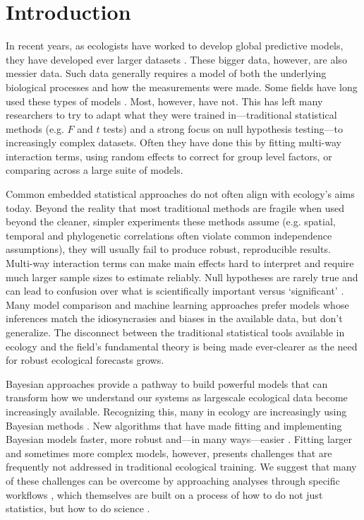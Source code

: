 \documentclass[11pt]{article}
\begin{document}
\setlength{\parindent}{0pt}
\setlength{\parskip}{7pt}

\section*{Introduction}
In recent years, as ecologists have worked to develop global predictive models, they have developed ever larger datasets \citep{Hampton2013}. These bigger data, however, are also messier data. Such data generally requires a model of both the underlying biological processes and how the measurements were made. Some fields have long used these types of models \citep[generally in fields focused on inferring population sizes of things people want to eat or manage,][]{muthuku2008,zheng2007,trijoulet2018,strinella2020potential}. Most, however, have not. This has left many researchers to try to adapt what they were trained in---traditional statistical methods (e.g. $F$ and $t$ tests) and a strong focus on null hypothesis testing---to increasingly complex datasets. Often they have done this by fitting multi-way interaction terms, using random effects to correct for group level factors, or comparing across a large suite of models. 

Common embedded statistical approaches do not often align with ecology's aims today. Beyond the reality that most traditional methods are fragile when used beyond the cleaner, simpler experiments these methods assume (e.g. spatial, temporal and phylogenetic correlations often violate common independence assumptions), they will usually fail to produce robust, reproducible results. Multi-way interaction terms can make main effects hard to interpret and require much larger sample sizes to estimate reliably. Null hypotheses are rarely true and can lead to confusion over what is scientifically important versus `significant' \citep{gelmanhill,muff2022rewriting}. Many model comparison and machine learning approaches prefer models whose inferences match the idiosyncrasies and biases in the available data, but don’t generalize. The disconnect between the traditional statistical tools available in ecology and the field's fundamental theory is being made ever-clearer as the need for robust ecological forecasts grows. 

Bayesian approaches provide a pathway to build powerful models that can transform how we understand our systems as largescale ecological data become increasingly available. Recognizing this, many in ecology are increasingly using Bayesian methods \citep{anderson2021trends}. New algorithms \citep[e.g. Hamiltonian Monte Carlo,][]{nuts2014,betan2019} that have made fitting and implementing Bayesian models faster, more robust and---in many ways---easier \citep{Carpenter:2017stan}. Fitting larger and sometimes more complex models, however, presents challenges that are frequently not addressed in traditional ecological training. We suggest that many of these challenges can be overcome by approaching analyses through specific workflows \citep{betanworkflow,grinsztajn2021,vandeschoot2021}, which themselves are built on a process of how to do not just statistics, but how to do science \citep{box1976science}. 
\end{document}
